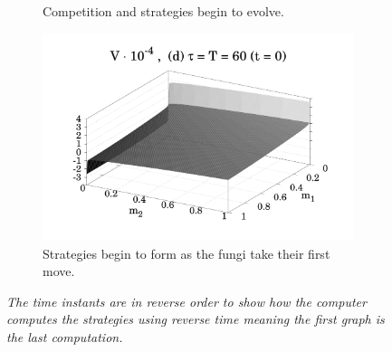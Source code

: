 \documentclass[11pt]{amsart}
\begin{document}
\begin{figure}
\begin{subfigure}{.48 \textwidth}
        \caption{Competition and strategies begin to evolve.}
        \label{fig_4_c}
    \end{subfigure}
    \hfill
    \begin{subfigure}{.48 \textwidth}
        \includegraphics[width = \textwidth]{figures/Figure_4d_1.pdf}
        \caption{Strategies begin to form as the fungi take their first move.}
        \label{fig_4_d}
    \end{subfigure}

\bf \caption{\it The time instants are in reverse order to show how the computer computes the strategies using reverse time meaning the first graph is the last computation.}
\label{Fig_4}
\end{figure}
\end{document}
